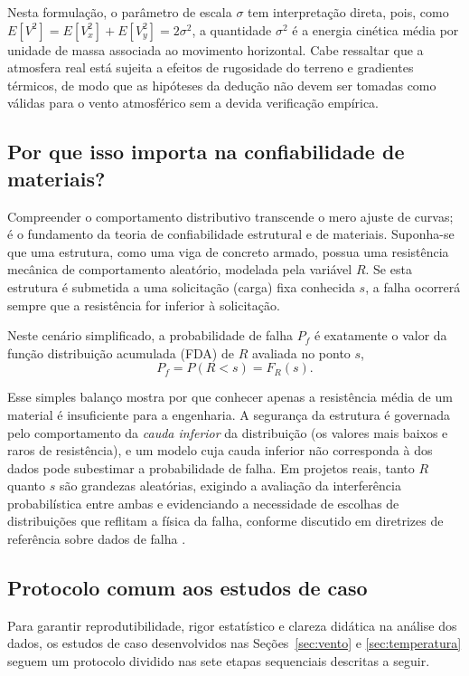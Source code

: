 Nesta formulação, o parâmetro de escala $\sigma$ tem interpretação direta, pois, como $E[V^2] = E[V_x^2] + E[V_y^2] = 2\sigma^2$, a quantidade $\sigma^2$ é a energia cinética média por unidade de massa associada ao movimento horizontal. Cabe ressaltar que a atmosfera real está sujeita a efeitos de rugosidade do terreno e gradientes térmicos, de modo que as hipóteses da dedução não devem ser tomadas como válidas para o vento atmosférico sem a devida verificação empírica.

\subsection{Por que isso importa na confiabilidade de materiais?}

Compreender o comportamento distributivo transcende o mero ajuste de curvas; é o fundamento da teoria de confiabilidade estrutural e de materiais. Suponha-se que uma estrutura, como uma viga de concreto armado, possua uma resistência mecânica de comportamento aleatório, modelada pela variável $R$. Se esta estrutura é submetida a uma solicitação (carga) fixa conhecida $s$, a falha ocorrerá sempre que a resistência for inferior à solicitação.

Neste cenário simplificado, a probabilidade de falha $P_f$ é exatamente o valor da função distribuição acumulada (FDA) de $R$ avaliada no ponto $s$,
\begin{equation}
    P_f = P(R < s) = F_R(s).
\end{equation}

Esse simples balanço mostra por que conhecer apenas a resistência média de um material é insuficiente para a engenharia. A segurança da estrutura é governada pelo comportamento da \textit{cauda inferior} da distribuição (os valores mais baixos e raros de resistência), e um modelo cuja cauda inferior não corresponda à dos dados pode subestimar a probabilidade de falha. Em projetos reais, tanto $R$ quanto $s$ são grandezas aleatórias, exigindo a avaliação da interferência probabilística entre ambas e evidenciando a necessidade de escolhas de distribuições que reflitam a física da falha, conforme discutido em diretrizes de referência sobre dados de falha \parencite{nist2012}.

\subsection{Protocolo comum aos estudos de caso}\label{subsec:protocolo}

Para garantir reprodutibilidade, rigor estatístico e clareza didática na análise dos dados, os estudos de caso desenvolvidos nas Seções~\ref{sec:vento} e \ref{sec:temperatura} seguem um protocolo dividido nas sete etapas sequenciais descritas a seguir.

